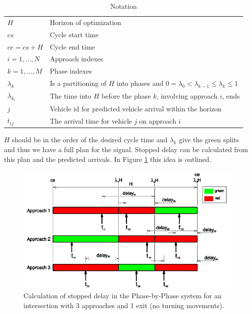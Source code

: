 \begin{table}[!ht]
\begin{center}
\begin{tabular}{ll}
\hline
$H$ & Horizon of optimization \\
$cs$ & Cycle start time \\
$ce = cs+H$ & Cycle end time \\
$i = 1,...,N$ & Approach indexes \\
$k = 1,...,M$ & Phase indexes \\
$\lambda_k$ &  Is a partitioning of $H$ into phases and $0 = \lambda_{0} <  \lambda_{k-1} \leq \lambda_k \leq 1$ \\
$\lambda_{k_i}$ & The time into $H$ before the phase $k$, involving approach $i$, ends \\
$j$ & Vehicle id for predicted vehicle arrival within the horizon  \\
$t_{ij}$ & The arrival time for vehicle $j$ on approach $i$
\\ \hline
\end{tabular}
\end{center}
\caption{Notation}
\end{table}

$H$ should be in the order of the desired cycle time and $\lambda_k$
give the green splits and thus we have a full plan for the
signal. Stopped delay can be calculated from this plan and the
predicted arrivals. In Figure \ref{fig:pp_delay} this idea is
outlined.

\begin{figure}[!ht]
\begin{center}
\includegraphics[scale=0.35]{phase-by-phase_delay-model.png} 
\end{center}
\caption{Calculation of stopped delay in the Phase-by-Phase system for an intersection with 3 approaches and 1 exit (no turning movements).}
\label{fig:pp_delay}
\end{figure}

